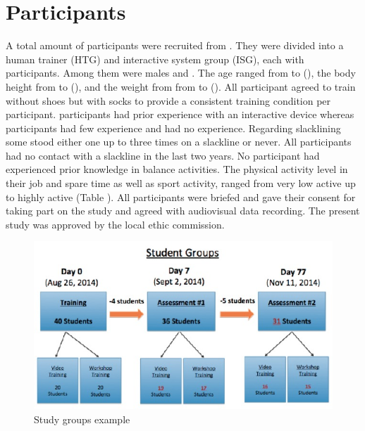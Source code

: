 \section{Participants}
A total amount of  participants were recruited from . They were divided into a human trainer (HTG) and interactive system group (ISG), each with  participants. Among them  were males and . The age ranged from  to  (), the body height from  to  (), and the weight from from  to  (). All participant agreed to train without shoes but with socks to provide a consistent training condition per participant.
 participants had prior experience with an interactive device whereas  participants had few experience and  had no experience. Regarding slacklining some stood either one up to three times on a slackline or never. All participants had no contact with a slackline in the last two years. No participant had experienced prior knowledge in balance activities. The physical activity level in their job and spare time as well as sport activity, ranged from very low active up to highly active (Table ). All participants were briefed and gave their consent for taking part on the study and agreed with audiovisual data recording. The present study was approved by the local ethic commission. 

\begin{figure}[htb]
	\centering
	\begin{minipage}[t]{1\linewidth}
		\centering
		\includegraphics[width=0.8\linewidth]{Pictures/6_studyGroupsExample}
		\caption{Study groups example}
		\label{fig:6_studyGroups}
	\end{minipage}
\end{figure}